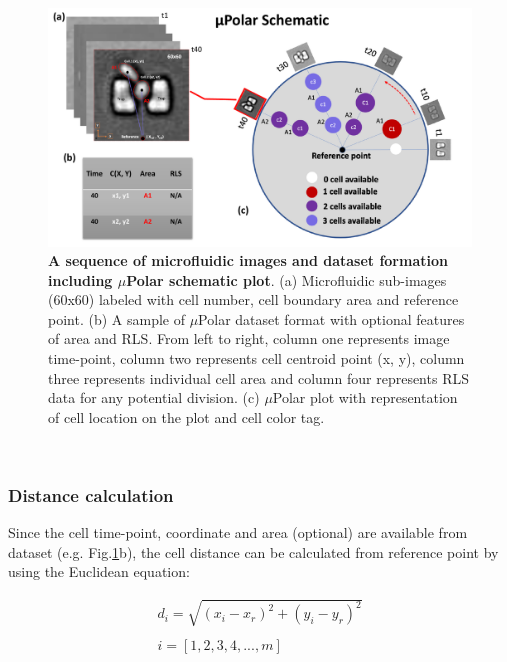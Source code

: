 \documentclass[conference]{IEEEtran}
\begin{document}
\begin{figure}
\centering
\includegraphics[width=\textwidth,height=10 cm]{Patterns/polar.pdf}
\caption{ \textbf{ A sequence of microfluidic images and dataset formation including $\mu$Polar schematic plot}. (a) Microfluidic sub-images (60x60) labeled with cell number, cell boundary area and reference point. (b) A sample of $\mu$Polar dataset format with optional features of area and RLS. From left to right, column one represents image time-point, column two represents cell centroid point (x, y), column three represents individual cell area and column four represents RLS data for any potential division. (c) $\mu$Polar plot with representation of cell location on the plot and cell color tag. }
\label{fig:table}
\end{figure}
\

\subsubsection{Distance calculation}
Since the cell time-point, coordinate and area (optional) are available from dataset (e.g. Fig.\ref{fig:table}b), the cell distance can be calculated from reference point by using the Euclidean equation:

\begin{equation}
\begin{split}
d_i = \sqrt{(x_i - x_r)^2 + (y_i - y_r)^2}\\
\\
i =  [1,2,3,4,..., m ] \\
\\
\end{split}
\end{equation}
\end{document}

